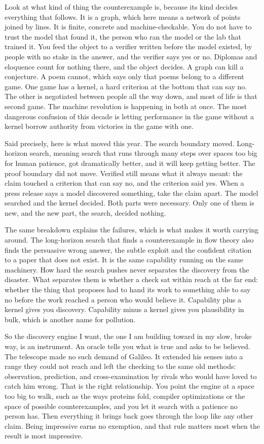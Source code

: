 \documentclass[11pt]{article}
\begin{document}
Look at what kind of thing the counterexample is, because its kind decides everything that follows. It is a graph, which here means a network of points joined by lines. It is finite, concrete and machine-checkable. You do not have to trust the model that found it, the person who ran the model or the lab that trained it. You feed the object to a verifier written before the model existed, by people with no stake in the answer, and the verifier says yes or no. Diplomas and eloquence count for nothing there, and the object decides. A graph can kill a conjecture. A poem cannot, which says only that poems belong to a different game. One game has a kernel, a hard criterion at the bottom that can say no. The other is negotiated between people all the way down, and most of life is that second game. The machine revolution is happening in both at once. The most dangerous confusion of this decade is letting performance in the game without a kernel borrow authority from victories in the game with one.

Said precisely, here is what moved this year. The search boundary moved. Long-horizon search, meaning search that runs through many steps over spaces too big for human patience, got dramatically better, and it will keep getting better. The proof boundary did not move. Verified still means what it always meant: the claim touched a criterion that can say no, and the criterion said yes. When a press release says a model discovered something, take the claim apart. The model searched and the kernel decided. Both parts were necessary. Only one of them is new, and the new part, the search, decided nothing.

The same breakdown explains the failures, which is what makes it worth carrying around. The long-horizon search that finds a counterexample in flow theory also finds the persuasive wrong answer, the subtle exploit and the confident citation to a paper that does not exist. It is the same capability running on the same machinery. How hard the search pushes never separates the discovery from the disaster. What separates them is whether a check sat within reach at the far end: whether the thing that proposes had to hand its work to something able to say no before the work reached a person who would believe it. Capability plus a kernel gives you discovery. Capability minus a kernel gives you plausibility in bulk, which is another name for pollution.

So the discovery engine I want, the one I am building toward in my slow, broke way, is an instrument. An oracle tells you what is true and asks to be believed. The telescope made no such demand of Galileo. It extended his senses into a range they could not reach and left the checking to the same old methods: observation, prediction, and cross-examination by rivals who would have loved to catch him wrong. That is the right relationship. You point the engine at a space too big to walk, such as the ways proteins fold, compiler optimizations or the space of possible counterexamples, and you let it search with a patience no person has. Then everything it brings back goes through the loop like any other claim. Being impressive earns no exemption, and that rule matters most when the result is most impressive.
\end{document}
